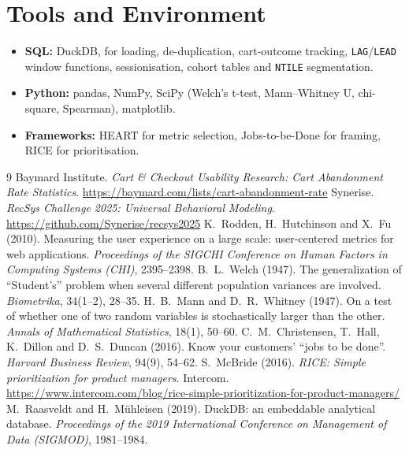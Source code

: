 \documentclass[11pt, a4paper]{article}
\begin{document}
\section*{Tools and Environment}
\begin{itemize}
  \item \textbf{SQL:} DuckDB, for loading, de-duplication, cart-outcome tracking, \texttt{LAG}/\texttt{LEAD} window functions, sessionisation, cohort tables and \texttt{NTILE} segmentation.
  \item \textbf{Python:} pandas, NumPy, SciPy (Welch's t-test, Mann--Whitney U, chi-square, Spearman), matplotlib.
  \item \textbf{Frameworks:} HEART for metric selection, Jobs-to-be-Done for framing, RICE for prioritisation.
\end{itemize}

\begin{thebibliography}{9}
 Baymard Institute. \textit{Cart \& Checkout Usability Research: Cart Abandonment Rate Statistics}. \url{https://baymard.com/lists/cart-abandonment-rate}
 Synerise. \textit{RecSys Challenge 2025: Universal Behavioral Modeling}. \url{https://github.com/Synerise/recsys2025}
 K.~Rodden, H.~Hutchinson and X.~Fu (2010). Measuring the user experience on a large scale: user-centered metrics for web applications. \textit{Proceedings of the SIGCHI Conference on Human Factors in Computing Systems (CHI)}, 2395--2398.
 B.~L.~Welch (1947). The generalization of ``Student's'' problem when several different population variances are involved. \textit{Biometrika}, 34(1--2), 28--35.
 H.~B.~Mann and D.~R.~Whitney (1947). On a test of whether one of two random variables is stochastically larger than the other. \textit{Annals of Mathematical Statistics}, 18(1), 50--60.
 C.~M.~Christensen, T.~Hall, K.~Dillon and D.~S.~Duncan (2016). Know your customers' ``jobs to be done''. \textit{Harvard Business Review}, 94(9), 54--62.
 S.~McBride (2016). \textit{RICE: Simple prioritization for product managers}. Intercom. \url{https://www.intercom.com/blog/rice-simple-prioritization-for-product-managers/}
 M.~Raasveldt and H.~M\"uhleisen (2019). DuckDB: an embeddable analytical database. \textit{Proceedings of the 2019 International Conference on Management of Data (SIGMOD)}, 1981--1984.
\end{thebibliography}
\end{document}
